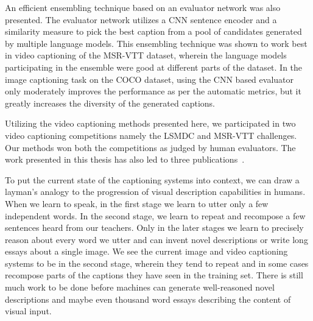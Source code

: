 An efficient ensembling technique based on an evaluator network was also
presented.
The evaluator network utilizes a CNN sentence encoder and a similarity measure
to pick the best caption from a pool of candidates generated by multiple
language models.
This ensembling technique was shown to work best in video captioning of the
MSR-VTT dataset, wherein the language models participating in the ensemble were
good at different parts of the dataset.
In the image captioning task on the COCO dataset, using the CNN based evaluator only
moderately improves the performance as per the automatic metrics, but it greatly
increases the diversity of the generated captions.

Utilizing the video captioning methods presented here, we participated in two
video captioning competitions namely the LSMDC and MSR-VTT challenges.
Our methods won both the competitions as judged by human evaluators.
The work presented in this thesis has also led to three
publications~\cite{shetty2015video,ShettyACMMM2016Wrk,ShettyACMMM2016}.

To put the current state of the captioning systems into context, we can draw a
layman's analogy to the progression of visual description capabilities in
humans.
When we learn to speak, in the first stage we learn to utter only a few
independent words.
In the second stage, we learn to repeat and recompose a few sentences heard from
our teachers.
Only in the later stages we learn to precisely reason about every word we utter
and can invent novel descriptions or write long essays about a single image. 
We see the current image and video captioning systems to be in the second stage,
wherein they tend to repeat and in some cases recompose parts of the captions
they have seen in the training set.
There is still much work to be done before machines can generate well-reasoned
novel descriptions and maybe even thousand word essays describing the content
of visual input.
